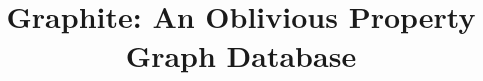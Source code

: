 \documentclass[sigconf]{acmart}
\newcommand{\system}{Graphite\xspace}
\begin{document}
\title{\system: An Oblivious Property Graph Database}




\maketitle








%
% 

%



\end{document}
